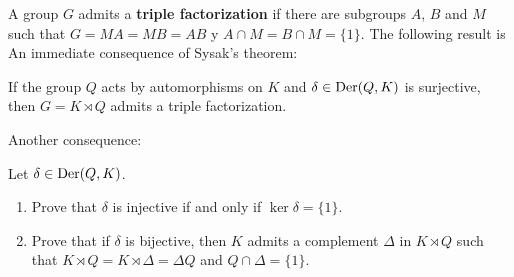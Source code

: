 A group $G$ admits a \textbf{triple factorization} if there are subgroups 
$A$, $B$ and $M$ such that $G=MA=MB=AB$ y $A\cap M=B\cap M=\{1\}$.
The following result is An immediate consequence of Sysak's theorem:



\begin{corollary}
	If the group $Q$ acts by automorphisms on $K$ and 
	$\delta\in\operatorname{Der}(Q,K)$ is surjective, then $G=K\rtimes Q$ admits a triple factorization. 
\end{corollary}

Another consequence: 

\begin{exercise}
	\label{xca:ker1cocycle}
	Let $\delta\in\operatorname{Der}(Q,K)$. 
	\begin{enumerate}
	\item Prove that $\delta$ is injective if and only if 
	$\ker\delta=\{1\}$.
	\item Prove that if $\delta$ is bijective, then  
	$K$ admits a complement 
	$\Delta$ in $K\rtimes Q$ such that $K\rtimes Q=K\rtimes\Delta=\Delta Q$ and 
	$Q\cap\Delta=\{1\}$.
	\end{enumerate}
\end{exercise}




